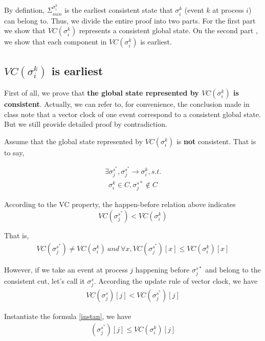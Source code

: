 \documentclass[11pt,a4paper]{article}
\begin{document}
By defintion, 
$ \Sigma_{min}^{\sigma_{i}^{k}}$ is the earliest consistent state that  $
\sigma_i^k$ (event $k$ at process $i$) can belong to. Thus, we divide the
entire proof into two parts. For the first part we show that
$VC(\sigma_{i}^{k})$ represents a consistent global state. On the second part , we 
show that each component in $VC(\sigma_{i}^{k})$ is earliest.

\subsection{$VC(\sigma_i^k)$ is earliest}
First of all, we prove that 
    \textbf{the global state represented by $VC(\sigma_i^k)$ is consistent}.
    Actually, we can refer to, for convenience, the conclusion made in class
    note that a vector clock of one event correspond to a consistent global
    state. But we still provide detailed proof by contradiction.

    Assume that the global state represented by $VC(\sigma_i^k)$ is
    \textbf{not} consistent. That is to say,

    \begin{align}
     \exists \sigma_j^{s^*}, \sigma_j^{s^*} \rightarrow \sigma_i^k, s.t. 
    \end{align}
    \begin{align}
     \sigma_i^k \in C, \sigma_j^{s*} \notin C 
    \end{align}

    According to the VC property, the happen-before relation above indicates
    $$ VC(\sigma_j^{s^*}) < VC(\sigma_i^{k})$$

    That is,
    \begin{align}
    VC(\sigma_j^{s^*}) \neq VC(\sigma_i^{k}) \ and \ \forall x,
    VC(\sigma_j^{s^*})[x] \leq VC(\sigma_i^{k})[x]  \label{instan}
    \end{align}

    However, if we take an event at process $j$ happening before
    $\sigma_j^{s*}$ and belong to the consistent cut, let's call it
    $\sigma_j^s$. According the update rule of vector clock, we have
    \begin{align}
    VC(\sigma_j^s)[j] < VC(\sigma_j^{s^*})[j]
    \end{align}

    Instantiate the formula \eqref{instan}, we have
    \begin{align}
        (\sigma_j^{s^*})[j] \leq VC(\sigma_i^{k})[j]
    \end{align}
\end{document}
